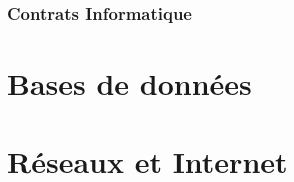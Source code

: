 \documentclass[10pt,a4paper,french]{article}
\begin{document}
\section{Contrats Informatique}

\part{Bases de données}

\part{Réseaux et Internet}

\appendix %

\end{document}
